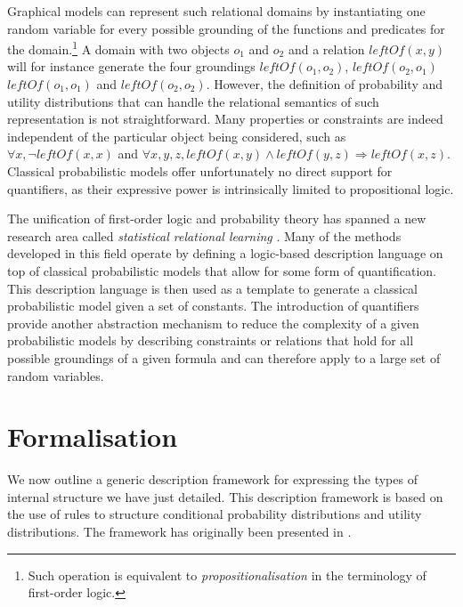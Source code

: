 Graphical models can represent such relational domains by instantiating one random variable for every possible grounding of the functions and predicates for the domain.\footnote{Such operation is equivalent to \textit{propositionalisation} in the terminology of first-order logic.}  A domain with two objects $o_1$ and $o_2$ and a relation $\mathit{leftOf}(x,y)$ will for instance generate the four groundings $\mathit{leftOf}(o_1,o_2)$, $\mathit{leftOf}(o_2,o_1)$ $\mathit{leftOf}(o_1,o_1)$ and $\mathit{leftOf}(o_2,o_2)$. However, the definition of probability and utility distributions that can handle the relational semantics of such representation is not straightforward.  Many properties or constraints are indeed independent of the particular object being considered, such as $\forall x, \neg \mathit{leftOf}(x,x)$ and $\forall x, y, z, \mathit{leftOf}(x,y) \land \mathit{leftOf}(y,z) \Rightarrow \mathit{leftOf}(x,z)$. Classical probabilistic models offer unfortunately no direct support for quantifiers, as their expressive power is intrinsically limited to propositional logic. 
 
The unification of first-order logic and probability theory has spanned a new research area called \textit{statistical relational learning} \citep{getoor:srlbook07}. Many of the methods developed in this field operate by defining a logic-based description language on top of classical probabilistic models that allow for some form of quantification. This description language is then used as a template to generate a classical probabilistic model given a set of constants. The introduction of quantifiers provide another abstraction mechanism to reduce the complexity of a given probabilistic models by describing constraints or relations that hold for all possible groundings of a given formula and can therefore apply to a large set of random variables. 

\section{Formalisation}
\label{sec:formalisation}

We now outline a generic description framework for expressing the types of internal structure we have just detailed.  This description framework is based on the use of rules to structure conditional probability distributions and utility distributions.  The framework has originally been presented in \cite{rulebasedmodels-sigdial2012,lison-semdial2012}.  

